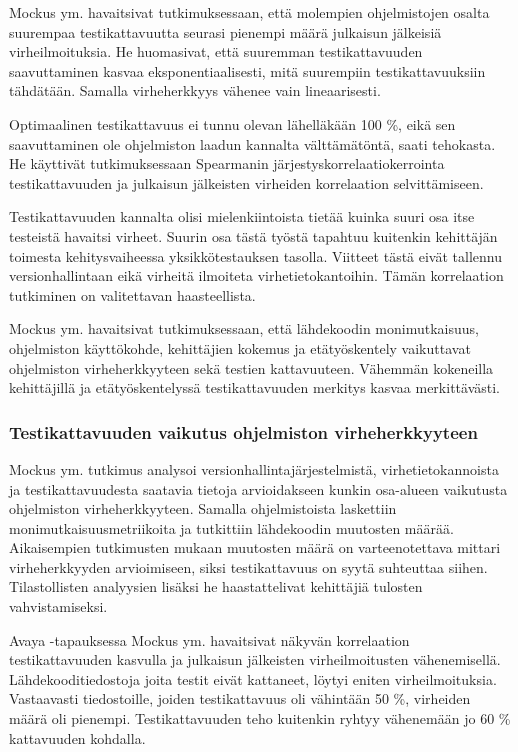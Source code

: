 \documentclass[finnish]{../tktltiki2}
\theoremstyle{definition}
\theoremstyle{remark}
\begin{document}
    Mockus ym. havaitsivat tutkimuksessaan, että molempien ohjelmistojen osalta suurempaa testikattavuutta seurasi 
pienempi määrä julkaisun jälkeisiä virheilmoituksia. He huomasivat, että suuremman testikattavuuden saavuttaminen kasvaa 
eksponentiaalisesti, mitä suurempiin testikattavuuksiin tähdätään. Samalla virheherkkyys vähenee vain lineaarisesti. 

    Optimaalinen testikattavuus ei tunnu olevan lähelläkään 100 \%, eikä sen saavuttaminen ole ohjelmiston laadun 
kannalta välttämätöntä, saati tehokasta. He käyttivät tutkimuksessaan Spearmanin järjestyskorrelaatiokerrointa 
testikattavuuden ja julkaisun jälkeisten virheiden korrelaation selvittämiseen.

    Testikattavuuden kannalta olisi mielenkiintoista tietää kuinka suuri osa itse testeistä havaitsi virheet. Suurin osa 
tästä työstä tapahtuu kuitenkin kehittäjän toimesta kehitysvaiheessa yksikkötestauksen tasolla. Viitteet tästä eivät 
tallennu versionhallintaan eikä virheitä ilmoiteta virhetietokantoihin. Tämän korrelaation tutkiminen on valitettavan 
haasteellista.

    Mockus ym. havaitsivat tutkimuksessaan, että lähdekoodin monimutkaisuus, ohjelmiston käyttökohde, kehittäjien 
kokemus ja etätyöskentely vaikuttavat ohjelmiston virheherkkyyteen sekä testien kattavuuteen. Vähemmän kokeneilla 
kehittäjillä ja etätyöskentelyssä testikattavuuden merkitys kasvaa merkittävästi. 

\subsubsection{Testikattavuuden vaikutus ohjelmiston virheherkkyyteen}

Mockus ym. tutkimus analysoi versionhallintajärjestelmistä, virhetietokannoista ja testikattavuudesta saatavia tietoja 
arvioidakseen kunkin osa-alueen vaikutusta ohjelmiston virheherkkyyteen. Samalla ohjelmistoista laskettiin 
monimutkaisuusmetriikoita ja tutkittiin lähdekoodin muutosten määrää. Aikaisempien tutkimusten mukaan muutosten määrä on 
varteenotettava mittari virheherkkyyden arvioimiseen, siksi testikattavuus on syytä suhteuttaa siihen. Tilastollisten 
analyysien lisäksi he haastattelivat kehittäjiä tulosten vahvistamiseksi.

    Avaya -tapauksessa Mockus ym. havaitsivat näkyvän korrelaation testikattavuuden kasvulla ja julkaisun jälkeisten 
virheilmoitusten vähenemisellä. Lähdekooditiedostoja joita testit eivät kattaneet, löytyi eniten virheilmoituksia. 
Vastaavasti tiedostoille, joiden testikattavuus oli vähintään 50 \%, virheiden määrä oli pienempi. Testikattavuuden 
teho kuitenkin ryhtyy vähenemään jo 60 \% kattavuuden kohdalla.
\end{document}
